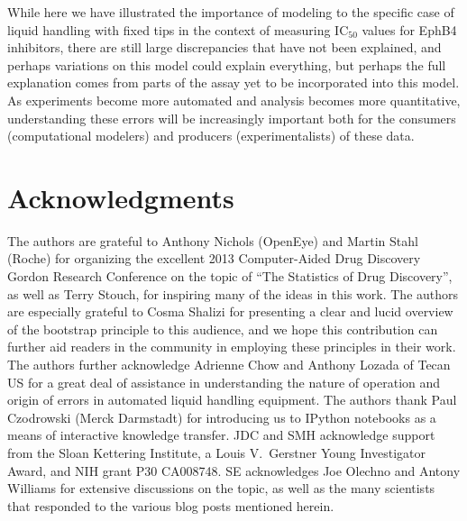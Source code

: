 \documentclass[aps,pre,twocolumn,nofootinbib,superscriptaddress,linenumbers]{revtex4-1}
\begin{document}
While here we have illustrated the importance of modeling to the specific case of liquid handling with fixed tips in the context of measuring IC$_{50}$ values for EphB4 inhibitors, there are still large discrepancies that have not been explained, and perhaps variations on this model could explain everything, but perhaps the full explanation comes from parts of the assay yet to be incorporated into this model.
As experiments become more automated and analysis becomes more quantitative, understanding these errors will be increasingly important both for the consumers (computational modelers) and producers (experimentalists) of these data.


\section{Acknowledgments}
\label{section:acknowledgments}
The authors are grateful to Anthony Nichols (OpenEye) and Martin Stahl (Roche) for organizing the excellent 2013 Computer-Aided Drug Discovery Gordon Research Conference on the topic of ``The Statistics of Drug Discovery'', as well as Terry Stouch, for inspiring many of the ideas in this work.
The authors are especially grateful to Cosma Shalizi for presenting a clear and lucid overview of the bootstrap principle to this audience, and we hope this contribution can further aid readers in the community in employing these principles in their work.
The authors further acknowledge Adrienne Chow and Anthony Lozada of Tecan US for a great deal of assistance in understanding the nature of operation and origin of errors in automated liquid handling equipment.
The authors thank Paul Czodrowski (Merck Darmstadt) for introducing us to IPython notebooks as a means of interactive knowledge transfer.
JDC and SMH acknowledge support from the Sloan Kettering Institute, a Louis V.~Gerstner Young Investigator Award, and NIH grant P30 CA008748.
SE acknowledges Joe Olechno and Antony Williams for extensive discussions on the topic, as well as the many scientists that responded to the various blog posts mentioned herein.

\end{document}
